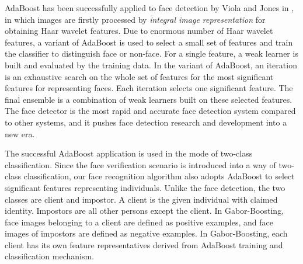 \documentclass[a4paper,10pt]{article}
\begin{document}
AdaBoost has been successfully applied to face detection by Viola and Jones in \cite{Viola2001}, in which images are firstly processed by \textit{integral image representation} for obtaining Haar wavelet features. Due to enormous number of Haar wavelet features, a variant of AdaBoost is used to select a small set of features and train the classifier to distinguish face or non-face. For a single feature, a weak learner is built and evaluated by the training data. In the variant of AdaBoost, an iteration is an exhaustive search on the whole set of features for the most significant features for representing faces. Each iteration selects one significant feature. The final ensemble is a combination of weak learners built on these selected features. The face detector is the most rapid and accurate face detection system compared to other systems, and it pushes face detection research and development into a new era. 

The successful AdaBoost application is used in the mode of two-class classification. Since the face verification scenario is introduced into a way of two-class classification, our face recognition algorithm also adopts AdaBoost to select significant features representing individuals. Unlike the face detection, the two classes are client and impostor. A client is the given individual with claimed identity. Impostors are all other persons except the client. In Gabor-Boosting, face images belonging to a client are defined as positive examples, and face images of impostors are defined as negative examples. In Gabor-Boosting, each client has its own feature representatives derived from AdaBoost training and classification mechanism.
\end{document}
